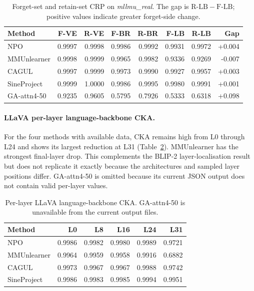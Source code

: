 \documentclass[letterpaper]{article}
\begin{document}
\begin{table}[h]
\centering
\caption{Forget-set and retain-set CRP on \emph{mllmu\_real}. The gap is
$\mathrm{R\mbox{-}LB}-\mathrm{F\mbox{-}LB}$; positive values indicate
greater forget-side change.}
\label{tab:selectivity}
\setlength{\tabcolsep}{4pt}
\scriptsize
\begin{tabular}{lrrrrrrr}
\toprule
\textbf{Method} & \textbf{F-VE} & \textbf{R-VE}
& \textbf{F-BR} & \textbf{R-BR}
& \textbf{F-LB} & \textbf{R-LB} & \textbf{Gap} \\
\midrule
NPO         & 0.9997 & 0.9998 & 0.9986 & 0.9992 & 0.9931 & 0.9972 & +0.004 \\
MMUnlearner & 0.9998 & 0.9999 & 0.9965 & 0.9982 & 0.9336 & 0.9269 & -0.007 \\
CAGUL       & 0.9997 & 0.9999 & 0.9973 & 0.9990 & 0.9927 & 0.9957 & +0.003 \\
SineProject & 0.9999 & 1.0000 & 0.9986 & 0.9995 & 0.9980 & 0.9991 & +0.001 \\
GA-attn4-50 & 0.9235 & 0.9605 & 0.5795 & 0.7926 & 0.5333 & 0.6318 & +0.098 \\
\bottomrule
\end{tabular}
\end{table}

\paragraph{LLaVA per-layer language-backbone CKA.}
For the four methods with available data, CKA remains high from L0 through
L24 and shows its largest reduction at L31 (Table~\ref{tab:lb_per_layer}).
MMUnlearner has the strongest final-layer drop. This complements the BLIP-2
layer-localisation result but does not replicate it exactly because the
architectures and sampled layer positions differ. GA-attn4-50 is omitted
because its current JSON output does not contain valid per-layer values.

\begin{table}[h]
\centering
\caption{Per-layer LLaVA language-backbone CKA. GA-attn4-50 is unavailable
from the current output files.}
\label{tab:lb_per_layer}
\setlength{\tabcolsep}{4pt}
\scriptsize
\begin{tabular}{lrrrrr}
\toprule
\textbf{Method} & \textbf{L0} & \textbf{L8} & \textbf{L16}
& \textbf{L24} & \textbf{L31} \\
\midrule
NPO         & 0.9986 & 0.9982 & 0.9980 & 0.9989 & 0.9721 \\
MMUnlearner & 0.9964 & 0.9959 & 0.9958 & 0.9916 & 0.6882 \\
CAGUL       & 0.9973 & 0.9967 & 0.9967 & 0.9988 & 0.9742 \\
SineProject & 0.9986 & 0.9983 & 0.9985 & 0.9994 & 0.9951 \\
\bottomrule
\end{tabular}
\end{table}
\end{document}

